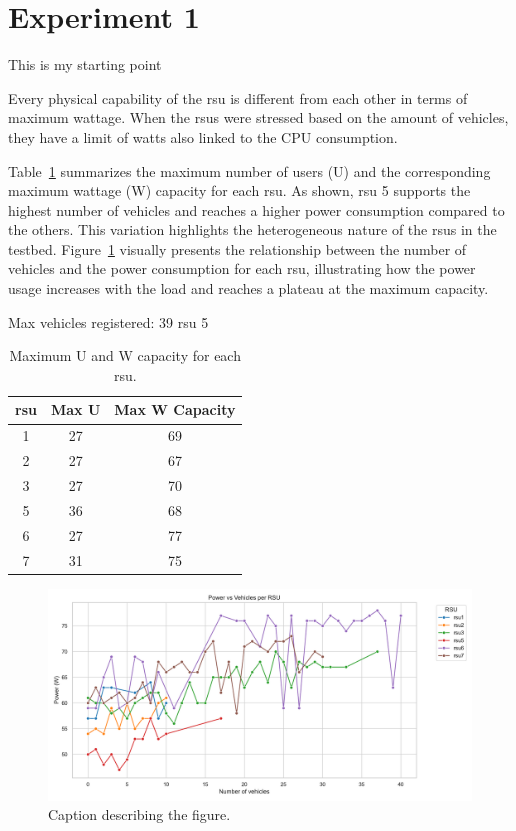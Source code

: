 \section{Experiment 1}\label{exp:1}
This is my starting point \cite{3gpp-ts-22-186,3gpp_ts_26_511_v18_1_0}

Every physical capability of the \gls{rsu} is different from each other in terms of maximum wattage.
When the \glspl{rsu} were stressed based on the amount of vehicles, they have a limit of watts also linked to the CPU consumption.




Table~\ref{tab:rsu-max-capacity} summarizes the maximum number of users (U) and the corresponding maximum wattage (W) capacity for each \gls{rsu}. As shown, \gls{rsu} 5 supports the highest number of vehicles and reaches a higher power consumption compared to the others. This variation highlights the heterogeneous nature of the \glspl{rsu} in the testbed. Figure~\ref{fig:exp1-figure} visually presents the relationship between the number of vehicles and the power consumption for each \gls{rsu}, illustrating how the power usage increases with the load and reaches a plateau at the maximum capacity.

Max vehicles registered: 39 \gls{rsu} 5
\begin{table}[ht]
    \centering
    \caption{Maximum U and W capacity for each \gls{rsu}.}
    \begin{tabular}{ccc}
        \hline
        \gls{rsu} & Max U & Max W Capacity \\
        \hline
        1         & 27    & 69             \\
        2         & 27    & 67             \\
        3         & 27    & 70             \\
        5         & 36    & 68             \\
        6         & 27    & 77             \\
        7         & 31    & 75             \\
        \hline
    \end{tabular}
    \label{tab:rsu-max-capacity}
\end{table}

\begin{figure}[!htb]
    \centering
    \includegraphics[width=0.8\linewidth]{Figures/power_vehicles_rsu_maximums.pdf}
    \caption{Caption describing the figure.}
    \label{fig:exp1-figure}
\end{figure}